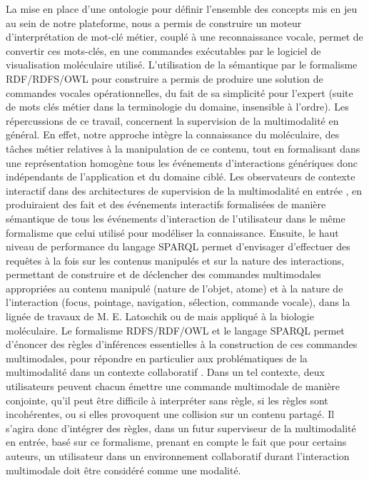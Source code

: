{La mise en place d'une ontologie pour définir l'ensemble des concepts mis en jeu au sein de notre plateforme, nous a permis de construire un moteur d'interprétation de mot-clé métier, couplé à une reconnaissance vocale, permet de convertir ces mots-clés, en une commandes exécutables par le logiciel de visualisation moléculaire utilisé. L'utilisation de la sémantique par le formalisme RDF/RDFS/OWL pour construire a permis de produire une solution de commandes vocales opérationnelles, du fait de sa simplicité pour l'expert (suite de mots clés métier dans la terminologie du domaine, insensible à l'ordre). Les répercussions de ce travail, concernent la supervision de la multimodalité en général. En effet, notre approche intègre la connaissance du moléculaire, des tâches métier relatives à la manipulation de ce contenu, tout en formalisant dans une représentation homogène tous les événements d'interactions génériques donc indépendants de l'application et du domaine ciblé. Les observateurs de contexte interactif dans des architectures de supervision de la multimodalité en entrée \cite{martin2014hardware}, en produiraient des fait et des événements interactifs formalisées de manière sémantique de tous les événements d'interaction de l'utilisateur dans le même formalisme que celui utilisé pour modéliser la connaissance. Ensuite, le haut niveau de performance du langage SPARQL permet d'envisager d'effectuer des requêtes à la fois sur les contenus manipulés et sur la nature des interactions, permettant de construire et de déclencher des commandes multimodales appropriées au contenu manipulé (nature de l'objet, atome) et à la nature de l'interaction (focus, pointage, navigation, sélection, commande vocale), dans la lignée de travaux de M. E. Latoschik \cite{Wiebusch:2015aa} ou de \cite{gutierrez2005semantics} mais appliqué à la biologie moléculaire. Le formalisme RDFS/RDF/OWL et le langage SPARQL permet d'énoncer des règles d'inférences essentielles à la construction de ces commandes multimodales, pour répondre en particulier aux problématiques de la multimodalité dans un contexte collaboratif \cite{martin2014hardware}.
Dans un tel contexte, deux utilisateurs peuvent chacun émettre une commande multimodale de manière conjointe, qu'il peut être difficile à interpréter sans règle, si les règles sont incohérentes, ou si elles provoquent une collision sur un contenu partagé. Il s'agira donc d'intégrer des règles, dans un futur superviseur de la multimodalité en entrée, basé sur ce formalisme, prenant en compte le fait que pour certains auteurs, un utilisateur dans un environnement collaboratif durant l'interaction multimodale doit être considéré comme une modalité.


}

